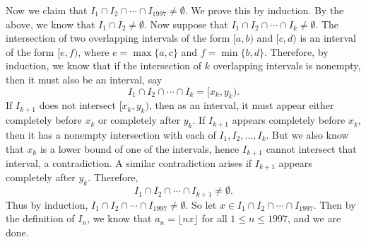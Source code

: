 \begin{enumerate}
 Now we claim that $I_1\cap I_2\cap \cdots \cap I_{1997}\ne \emptyset$. We prove this by induction. By the above, we know that $I_1\cap I_2\ne \emptyset$. Now suppose that $I_1\cap I_2\cap\cdots\cap I_k\ne \emptyset$. The intersection of two overlapping intervals of the form $[a,b)$ and $[c,d)$ is an interval of the form $[e,f)$, where $e=\max\{a,c\}$ and $f=\min\{b,d\}$. Therefore, by induction, we know that if the intersection of $k$ overlapping intervals is nonempty, then it must also be an interval, say
 \[I_1\cap I_2\cap\cdots\cap I_k=[x_k,y_k).\]If $I_{k+1}$ does not intersect $[x_k,y_k)$, then as an interval, it must appear either completely before $x_k$ or completely after $y_k$.  If $I_{k+1}$ appears completely before $x_k$, then it has a nonempty intersection with each of $I_1, I_2, \dots, I_k$. But we also know that $x_k$ is a lower bound of one of the intervals, hence $I_{k+1}$ cannot intersect that interval, a contradiction. A similar contradiction arises if $I_{k+1}$ appears completely after $y_k$. Therefore,
 \[I_1\cap I_2\cap\cdots\cap I_{k+1}\ne \emptyset.\]Thus by induction, $I_1\cap I_2\cap\cdots\cap I_{1997}\ne \emptyset$. So let $x\in I_1\cap I_2\cap\cdots\cap I_{1997}$. Then by the definition of $I_n$, we know that $a_n=\lfloor nx\rfloor$ for all $1\le n\le 1997$, and we are done.

 


\end{enumerate}